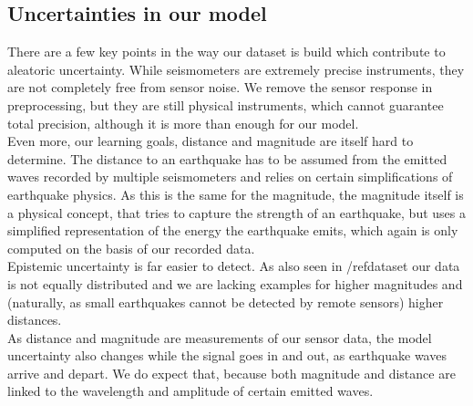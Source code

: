 \documentclass[thesis.tex]{subfiles}
\begin{document}
\subsection{Uncertainties in our model}
There are a few key points in the way our dataset is build which contribute to aleatoric uncertainty. While seismometers are extremely precise instruments, they are not completely free from sensor noise. We remove the sensor response in preprocessing, but they are still physical instruments, which cannot guarantee total precision, although it is more than enough for our model. 
\\
Even more, our learning goals, distance and magnitude are itself hard to determine. The distance to an earthquake has to be assumed from the emitted waves recorded by multiple seismometers and relies on certain simplifications of earthquake physics. As this is the same for the magnitude, the magnitude itself is a physical concept, that tries to capture the strength of an earthquake, but uses a simplified representation of the energy the earthquake emits, which again is only computed on the basis of our recorded data.\\
Epistemic uncertainty is far easier to detect. As also seen in /ref{dataset} our data is not equally distributed and we are lacking examples for higher magnitudes and (naturally, as small earthquakes cannot be detected by remote sensors) higher distances. \\
As distance and magnitude are measurements of our sensor data, the model uncertainty also changes while the signal goes in and out, as earthquake waves arrive and depart. We do expect that, because both magnitude and distance are linked to the wavelength and amplitude of certain emitted waves.
\end{document}
